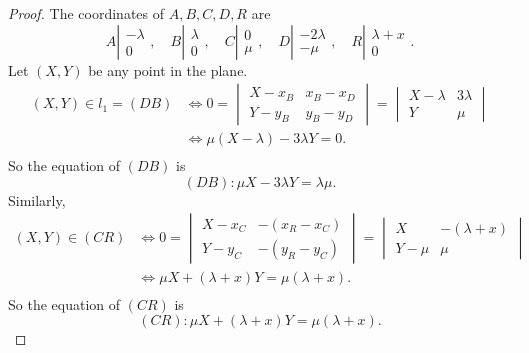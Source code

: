 \documentclass[11pt,a4paper]{article}
\begin{document}
\begin{proof}
	The coordinates of $A,B,C,D,R$ are
$$ A \left | 
\begin{array}{c}
  -\lambda\\
 0 
\end{array}
\right.
, \quad 
B \left | 
\begin{array}{c}
  \lambda\\
 0 
\end{array}
\right.
, \quad 
C \left | 
\begin{array}{c}
 0\\
\mu
\end{array}
\right.
, \quad 
D \left | 
\begin{array}{c}
  -2\lambda\\
-\mu
\end{array}
\right.
, \quad 
R \left | 
\begin{array}{c}
  \lambda + x\\
 0 
\end{array}
\right.
.
$$	
Let $(X,Y)$ be any point in the plane.
\begin{align*}
(X,Y) \in l_1 = (DB) &\iff 0 = \begin{vmatrix} X - x_B & x_B - x_D \\Y-y_B & y_B - y_D \end{vmatrix} = \begin{vmatrix} X - \lambda & 3 \lambda \\Y&\mu \end{vmatrix}\\
	&\iff \mu(X-\lambda) - 3\lambda Y= 0.\\
\end{align*}
So the equation of $(DB)$ is
$$(DB) : \mu X - 3 \lambda Y = \lambda \mu.$$
Similarly,
\begin{align*}
(X,Y) \in (CR) &\iff 0 = \begin{vmatrix} X - x_C & -(x_R - x_C) \\Y-y_C &-(y_R-y_C) \end{vmatrix} = \begin{vmatrix} X  & -( \lambda +x)\\Y - \mu &\mu \end{vmatrix}\\
	&\iff \mu X +(\lambda+x) Y = \mu(\lambda + x) .\\
\end{align*}
So the equation of $(CR)$ is
$$(CR) : \mu X +(\lambda + x) Y =\mu(\lambda + x).$$


\end{proof}
\end{document}
